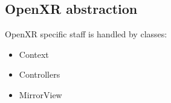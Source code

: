 \newpage

\subsection{OpenXR abstraction}
\label{sec:openxr}
OpenXR specific staff is handled by classes:
\begin{itemize}
    \item Context
    \item Controllers
    \item  MirrorView
\end{itemize}

